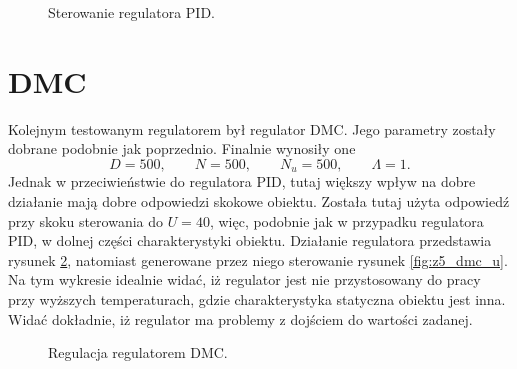\begin{figure}[tb]
\centering
{}
\caption{Sterowanie regulatora PID.}
\label{fig:z5_pid_u}
\end{figure}

\section{DMC}
Kolejnym testowanym regulatorem był regulator DMC. Jego parametry zostały dobrane
podobnie jak poprzednio. Finalnie wynosiły one
\begin{equation}
  D = 500, \qquad N = 500, \qquad N_u = 500, \qquad \Lambda = 1.
\end{equation}
Jednak w przeciwieństwie do regulatora PID, tutaj większy wpływ na dobre działanie
mają dobre odpowiedzi skokowe obiektu. Została tutaj użyta odpowiedź przy skoku
sterowania do $U = 40$, więc, podobnie jak w przypadku regulatora PID, w dolnej
części charakterystyki obiektu. Działanie regulatora przedstawia rysunek \ref{fig:z5_dmc},
natomiast generowane przez niego sterowanie rysunek \ref{fig:z5_dmc_u}. Na tym wykresie
idealnie widać, iż regulator jest nie przystosowany do pracy przy wyższych temperaturach,
gdzie charakterystyka statyczna obiektu jest inna. Widać dokładnie, iż regulator ma problemy
z dojściem do wartości zadanej.


\begin{figure}[tb]
\centering
{}
\caption{Regulacja regulatorem DMC.}
\label{fig:z5_dmc}
\end{figure}

